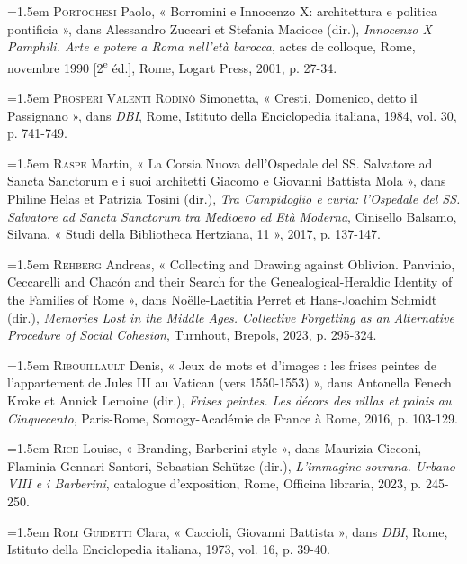 \documentclass[12pt,twoside,openany]{book}
\newenvironment{PurhBibliography}
  {%
    \par
    \setlength{\parindent}{0pt}%
    \setlength{\leftskip}{0pt}%
  }
  {%
    \par
  }
\begin{document}
\begin{PurhBibliography}
\noindent\hangindent=1.5em \textsc{Portoghesi} Paolo, « Borromini e Innocenzo X: architettura e politica pontificia », dans Alessandro Zuccari et Stefania Macioce (dir.), \textit{Innocenzo X Pamphili. Arte e potere a Roma nell’età barocca}, actes de colloque, Rome, novembre 1990 [2\textsuperscript{e} éd.], Rome, Logart Press, 2001, p. 27-34.\par
\noindent\hangindent=1.5em \textsc{Prosperi Valenti Rodinò} Simonetta, « Cresti, Domenico, detto il Passignano », dans \textit{DBI}, Rome, Istituto della Enciclopedia italiana, 1984, vol. 30, p. 741-749.\par
\noindent\hangindent=1.5em \textsc{Raspe} Martin, « La Corsia Nuova dell’Ospedale del \textsc{SS}. Salvatore ad Sancta Sanctorum e i suoi architetti Giacomo e Giovanni Battista Mola », dans Philine Helas et Patrizia Tosini (dir.), \textit{Tra Campidoglio e curia: l’Ospedale del SS. Salvatore ad Sancta Sanctorum tra Medioevo ed Età Moderna}, Cinisello Balsamo, Silvana, « Studi della Bibliotheca Hertziana, 11 », 2017, p. 137-147.\par
\noindent\hangindent=1.5em \textsc{Rehberg} Andreas, « Collecting and Drawing against Oblivion. Panvinio, Ceccarelli and Chacón and their Search for the Genealogical-Heraldic Identity of the Families of Rome », dans Noëlle-Laetitia Perret et Hans-Joachim Schmidt (dir.), \textit{Memories Lost in the Middle Ages. Collective Forgetting as an Alternative Procedure of Social Cohesion}, Turnhout, Brepols, 2023, p. 295-324.\par
\noindent\hangindent=1.5em \textsc{Ribouillault} Denis, « Jeux de mots et d’images : les frises peintes de l’appartement de Jules \textsc{III} au Vatican (vers 1550-1553) », dans Antonella Fenech Kroke et Annick Lemoine (dir.), \textit{Frises peintes. Les décors des villas et palais au Cinquecento}, Paris-Rome, Somogy-Académie de France à Rome, 2016, p. 103-129.\par
\noindent\hangindent=1.5em \textsc{Rice} Louise, « Branding, Barberini-style », dans Maurizia Cicconi, Flaminia Gennari Santori, Sebastian Schütze (dir.), \textit{L’immagine sovrana. Urbano VIII e i Barberini}, catalogue d’exposition, Rome, Officina libraria, 2023, p. 245-250.\par
\noindent\hangindent=1.5em \textsc{Roli Guidetti} Clara, « Caccioli, Giovanni Battista », dans \textit{DBI}, Rome, Istituto della Enciclopedia italiana, 1973, vol. 16, p. 39-40.\par

\end{PurhBibliography}
\end{document}
